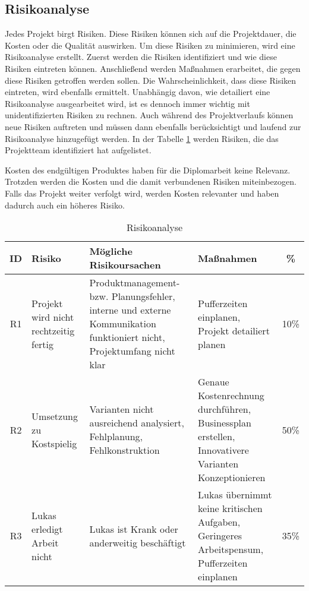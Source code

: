 \subsection{Risikoanalyse}

Jedes Projekt birgt Risiken. Diese Risiken können sich auf die Projektdauer, die Kosten oder die Qualität auswirken. Um diese Risiken zu minimieren, wird eine Risikoanalyse erstellt. Zuerst werden die Risiken identifiziert und wie diese Risiken eintreten können. Anschließend werden Maßnahmen erarbeitet, die gegen diese Risiken getroffen werden sollen. Die Wahrscheinlichkeit, dass diese Risiken eintreten, wird ebenfalls ermittelt. Unabhängig davon, wie detailiert eine Risikoanalyse ausgearbeitet wird, ist es dennoch immer wichtig mit unidentifizierten Risiken zu rechnen. Auch während des Projektverlaufs können neue Risiken auftreten und müssen dann ebenfalls berücksichtigt und laufend zur Risikoanalyse hinzugefügt werden\cite{risikomanagement}. In der Tabelle \ref{tab:risikoanalyse} werden Risiken, die das Projektteam identifiziert hat aufgelistet.

Kosten des endgültigen Produktes haben für die Diplomarbeit keine Relevanz. Trotzden werden die Kosten und die damit verbundenen Risiken miteinbezogen. Falls das Projekt weiter verfolgt wird, werden Kosten relevanter und haben dadurch auch ein höheres Risiko.

\begin{table}[H]
  {
    \small
    \begin{tabular}{|c|p{}|p{}|p{}|c|}
      \hline
      ID & Risiko                                & Mögliche Risikoursachen                                                                                                & Maßnahmen                                                                                         & \%   \\ \hline
      R1 & Projekt wird nicht rechtzeitig fertig & Produktmanagement- bzw. Planungsfehler, interne und externe Kommunikation funktioniert nicht, Projektumfang nicht klar & Pufferzeiten einplanen, Projekt detailiert planen                                                 & 10\% \\ \hline
      R2 & Umsetzung zu Kostspielig              & Varianten nicht ausreichend analysiert, Fehlplanung, Fehlkonstruktion                                                  & Genaue Kostenrechnung durchführen, Businessplan erstellen, Innovativere Varianten Konzeptionieren & 50\% \\ \hline
      R3 & Lukas erledigt Arbeit nicht           & Lukas ist Krank oder anderweitig beschäftigt                                                                           & Lukas übernimmt keine kritischen Aufgaben, Geringeres Arbeitspensum, Pufferzeiten einplanen       & 35\% \\ \hline
    \end{tabular}}
  \caption{Risikoanalyse}
  \label{tab:risikoanalyse}
\end{table}
